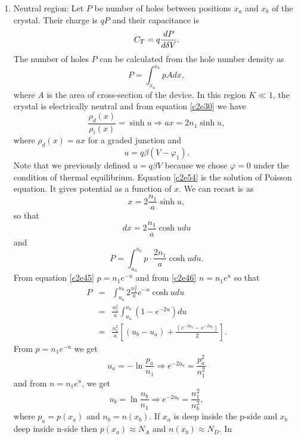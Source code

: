 \begin{enumerate}
\item Neutral region:
Let $P$ be number of holes between positions $x_a$ and $x_b$ of the crystal.
Their charge is $qP$ and their capacitance is
\begin{equation}\label{c2e52}
C_T = q\frac{d{P}}{d{\delta V}}.
\end{equation}
The number of holes $P$ can be calculated from the hole number density as
\begin{equation}\label{c2e53}
P = \int_{x_a}^{x_b}pAdx,
\end{equation}
where $A$ is the area of cross-section of the device. In this region $K
\ll 1$, the crystal is electrically neutral and from equation \eqref{c2e30} we
have
\begin{equation}\label{c2e54}
\frac{\rho_d(x)}{\rho_i(x)} = \sinh u \Rightarrow ax = 2n_1\sinh u,
\end{equation}
where $\rho_d(x) = ax$ for a graded junction and
\begin{equation}\label{c2e55}
u = q\beta(V - \varphi_1).
\end{equation}
Note that we previously defined $u = q\beta V$ because we chose $\varphi = 0$
under the condition of thermal equilibrium. Equation \eqref{c2e54} is the 
solution of Poisson equation. It gives potential as a function of $x$. We can
recast is as
\[
x = 2\frac{n_1}{a}\sinh u,
\]
so that
\[
dx = 2\frac{n_1}{a}\cosh u du
\]
and 
\[
P = \int_{u_a}^{u_b} p \cdot \frac{2n_1}{a} \cosh u du.
\]
From equation \eqref{c2e45} $p = n_1 e^{-u}$ and from \eqref{c2e46} $n=n_1e^u$
so that
\begin{eqnarray}
P &=& \int_{u_a}^{u_b}2\frac{n_1^2}{a}e^{-u}\cosh u du \nonumber \\
 &=& \frac{n_1^2}{a}\int_{u_a}^{u_b}(1 - e^{-2u})du \nonumber \\
 &=& \frac{n_1^2}{a}\left[(u_b - u_a)+\frac{(e^{-2u_a} - e^{-2u_b})}{2}\right].
  \label{c2e56}
\end{eqnarray}
From $p = n_1 e^{-u}$ we get
\begin{equation}\label{c2e57}
u_a = -\ln\frac{p_a}{n_1} \Rightarrow e^{-2u_a} = \frac{p_a^2}{n_1^2}
\end{equation}
and from $n = n_1 e^u$, we get
\begin{equation}\label{c2e58}
u_b = \ln\frac{n_b}{n_1} \Rightarrow e^{-2u_b} = \frac{n_1^2}{n_b^2},
\end{equation}
where $p_a = p(x_a)$ and $n_b = n(x_b)$. If $x_a$ is deep inside the p-side and
$x_b$ deep inside n-side then $p(x_a) \approx N_A$ and $n(x_b) \approx N_D$. In

\end{enumerate}
